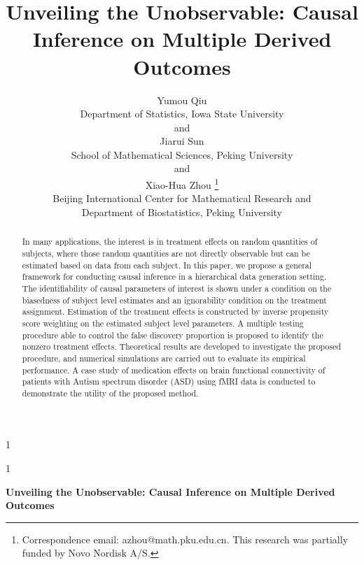 \documentclass[12pt]{article}
\theoremstyle{definition}
\newcommand{\blind}{1}
\begin{document}
\def\spacingset#1{\renewcommand{\baselinestretch}%
{#1}\small\normalsize} \spacingset{1}

\blind
{
  \title{\bf Unveiling the Unobservable: Causal Inference on Multiple Derived Outcomes}
  \author{Yumou Qiu \\
    Department of Statistics, Iowa State University\\
    and \\
    Jiarui Sun \\
    School of Mathematical Sciences, Peking University \\
    and \\
    Xiao-Hua Zhou \thanks{ 
    Correspondence email: azhou@math.pku.edu.cn. This research was partially funded by Novo Nordisk A/S.}\hspace{.2cm} \\
    Beijing International Center for Mathematical Research and \\
    Department of Biostatistics, Peking University \\
    }
    \date{}
  \maketitle
} \fi

\blind
{
  \bigskip
  \bigskip
  \bigskip
  \begin{center}
    {\LARGE\bf {Unveiling the Unobservable: Causal Inference on Multiple Derived Outcomes}}
\end{center}
  \medskip
} \fi

\bigskip
\begin{abstract}
In many applications, the interest is in treatment effects on random quantities of subjects, where those random quantities are not directly observable but can be estimated based on data from each subject. In this paper, we propose a general framework for conducting causal inference in a
hierarchical data generation setting. The identifiability of causal parameters of interest is shown under a condition on the biasedness of subject level estimates and an ignorability condition on the treatment assignment. 
Estimation of the treatment effects is constructed by inverse propensity score weighting on the estimated subject level parameters. 
A multiple testing procedure able to control the false discovery proportion is proposed to identify the nonzero treatment effects.  
Theoretical results are developed to investigate the proposed procedure, and numerical simulations are carried out to evaluate its empirical performance. 
A case study of medication effects on brain functional connectivity of patients with Autism spectrum disorder (ASD) using fMRI data is conducted to demonstrate the utility of the proposed method. 
\end{abstract}
\end{document}
